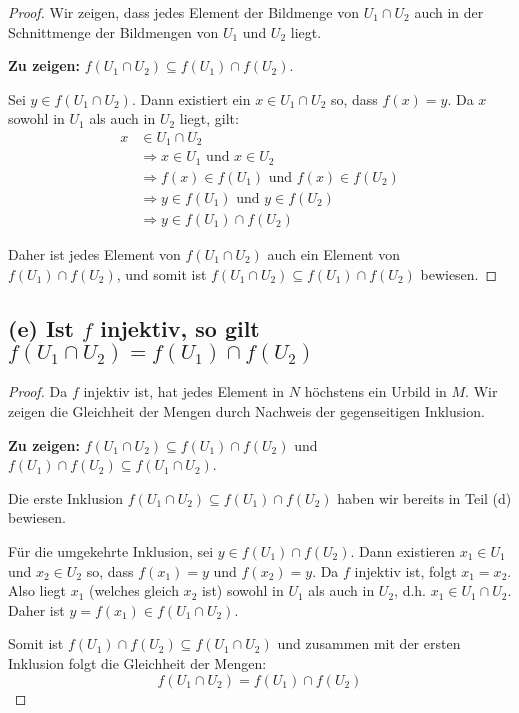 \documentclass[12pt]{article}
\begin{document}
\begin{proof}
	Wir zeigen, dass jedes Element der Bildmenge von \( U_1 \cap U_2 \) auch in der Schnittmenge der Bildmengen von \( U_1 \) und \( U_2 \) liegt.
	
	\textbf{Zu zeigen:} \( f(U_1 \cap U_2) \subseteq f(U_1) \cap f(U_2) \).
	
	Sei \( y \in f(U_1 \cap U_2) \). Dann existiert ein \( x \in U_1 \cap U_2 \) so, dass \( f(x) = y \). Da \( x \) sowohl in \( U_1 \) als auch in \( U_2 \) liegt, gilt:
	\begin{align*}
		x & \in U_1 \cap U_2                                         \\
		  & \Rightarrow x \in U_1 \text{ und } x \in U_2             \\
		  & \Rightarrow f(x) \in f(U_1) \text{ und } f(x) \in f(U_2) \\
		  & \Rightarrow y \in f(U_1) \text{ und } y \in f(U_2)       \\
		  & \Rightarrow y \in f(U_1) \cap f(U_2)
	\end{align*}
	
	Daher ist jedes Element von \( f(U_1 \cap U_2) \) auch ein Element von \( f(U_1) \cap f(U_2) \), und somit ist \( f(U_1 \cap U_2) \subseteq f(U_1) \cap f(U_2) \) bewiesen.
\end{proof}


\subsection*{(e) Ist \( f \) injektiv, so gilt \( f(U_1 \cap U_2) = f(U_1) \cap f(U_2) \)}

\begin{proof}
	Da \( f \) injektiv ist, hat jedes Element in \( N \) höchstens ein Urbild in \( M \). Wir zeigen die Gleichheit der Mengen durch Nachweis der gegenseitigen Inklusion.
	
	\textbf{Zu zeigen:} \( f(U_1 \cap U_2) \subseteq f(U_1) \cap f(U_2) \) und \( f(U_1) \cap f(U_2) \subseteq f(U_1 \cap U_2) \).
	
	Die erste Inklusion \( f(U_1 \cap U_2) \subseteq f(U_1) \cap f(U_2) \) haben wir bereits in Teil (d) bewiesen.
	
	Für die umgekehrte Inklusion, sei \( y \in f(U_1) \cap f(U_2) \). Dann existieren \( x_1 \in U_1 \) und \( x_2 \in U_2 \) so, dass \( f(x_1) = y \) und \( f(x_2) = y \). Da \( f \) injektiv ist, folgt \( x_1 = x_2 \). Also liegt \( x_1 \) (welches gleich \( x_2 \) ist) sowohl in \( U_1 \) als auch in \( U_2 \), d.h. \( x_1 \in U_1 \cap U_2 \). Daher ist \( y = f(x_1) \in f(U_1 \cap U_2) \).
	
	Somit ist \( f(U_1) \cap f(U_2) \subseteq f(U_1 \cap U_2) \) und zusammen mit der ersten Inklusion folgt die Gleichheit der Mengen:
	\[ f(U_1 \cap U_2) = f(U_1) \cap f(U_2) \]
\end{proof}
\end{document}
